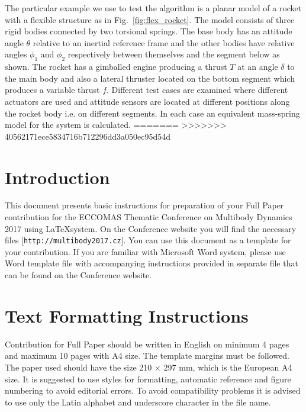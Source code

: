 \documentclass{mbd_fullpaper}
\begin{document}
The particular example we use to test the algorithm is a planar model of a rocket with a flexible structure as in Fig.~\ref{fig:flex_rocket}. The model consists of three rigid bodies connected by two torsional springs. The base body has an attitude angle $\theta$ relative to an inertial reference frame and the other bodies have relative angles $\phi_1$ and $\phi_2$ respectively between themselves and the segment below as shown. The rocket has a gimballed engine producing a thrust $T$ at an angle $\delta$ to the main body and also a lateral thruster located on the bottom segment which produces a variable thrust $f$. Different test cases are examined where different actuators are used and attitude sensors are located at different positions along the rocket body i.e. on different segments. In each case an equivalent mass-spring model for the system is calculated.
=======
>>>>>>> 40562171ece5834716b712296dd3a050ec95d54d

\section{Introduction}

This document presents basic instructions for preparation of your Full Paper contribution for the ECCOMAS Thematic Conference on Multibody Dynamics 2017 using \LaTeX system. On the Conference website you will find the necessary files [\texttt{http://multibody2017.cz}]. You can use this document as a template for your contribution. If you are familiar with Microsoft Word system, please use Word template file with accompanying instructions provided in separate file that can be found on the Conference website.


\section{Text Formatting Instructions}
Contribution for Full Paper should be written in English on minimum 4 pages and maximum 10 pages with A4 size. The template margins must be followed. The paper used should have the size 210 $\times$ 297 mm, which is the European A4 size. It is suggested to use styles for formatting, automatic reference and figure numbering to avoid editorial errors. To avoid compatibility problems it is advised to use only the Latin alphabet and underscore character in the file name.
\end{document}
